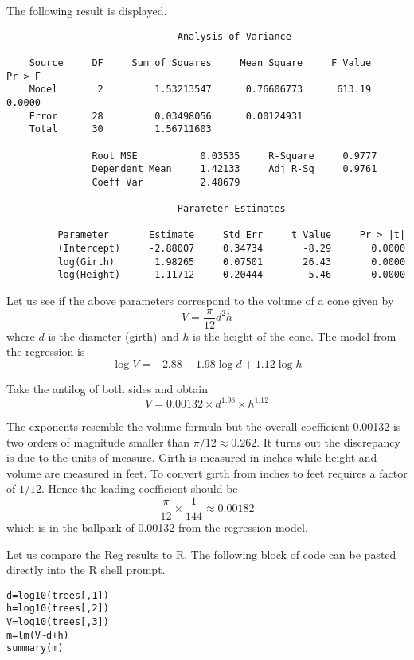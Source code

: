 \documentclass[12pt]{article}
\begin{document}
The following result is displayed.

{\footnotesize\begin{verbatim}
                              Analysis of Variance

    Source     DF     Sum of Squares     Mean Square     F Value     Pr > F
    Model       2         1.53213547      0.76606773      613.19     0.0000
    Error      28         0.03498056      0.00124931                       
    Total      30         1.56711603                                       

               Root MSE           0.03535     R-Square     0.9777
               Dependent Mean     1.42133     Adj R-Sq     0.9761
               Coeff Var          2.48679                        

                              Parameter Estimates

         Parameter       Estimate     Std Err     t Value     Pr > |t|
         (Intercept)     -2.88007     0.34734       -8.29       0.0000
         log(Girth)       1.98265     0.07501       26.43       0.0000
         log(Height)      1.11712     0.20444        5.46       0.0000
\end{verbatim}}

Let us see if the above parameters correspond to the volume of a cone
given by
$$
V=\frac{\pi}{12}d^2h
$$
where $d$ is the diameter (girth) and $h$ is the height of the cone.
The model from the regression is
$$
\log V=-2.88+1.98\log d+1.12\log h
$$

Take the antilog of both sides and obtain
$$
V=0.00132\times d^{1.98}\times h^{1.12}
$$

The exponents resemble the volume formula but the overall coefficient 0.00132
is two orders of magnitude smaller than $\pi/12\approx0.262$.
It turns out the discrepancy is due to the units of measure.
Girth is measured in inches while height and volume are measured in feet.
To convert girth from inches to feet requires a factor of $1/12$.
Hence the leading coefficient should be
$$
\frac{\pi}{12}\times\frac{1}{144}\approx0.00182
$$
which is in the ballpark of 0.00132 from the regression model.

\bigskip

Let us compare the Reg results to R.
The following block of code can be pasted directly into the R shell prompt.

{\footnotesize\begin{verbatim}
d=log10(trees[,1])
h=log10(trees[,2])
V=log10(trees[,3])
m=lm(V~d+h)
summary(m)
\end{verbatim}}
\end{document}
